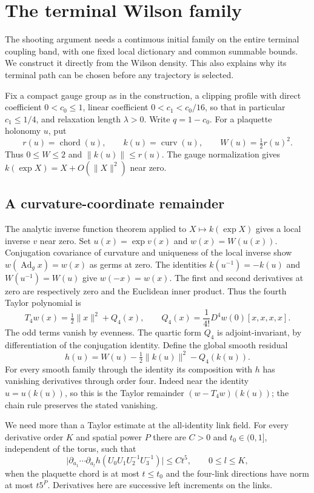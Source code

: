 \section{The terminal Wilson family}
\label{sec:wilson-startup-construction}
The shooting argument needs a continuous initial family on the entire
terminal coupling band, with one fixed local dictionary and common
summable bounds. We construct it directly from the Wilson density.
This also explains why its terminal path can be chosen before any
trajectory is selected.

Fix a compact gauge group as in the construction, a clipping profile
with direct coefficient $0<c_0\le1$, linear coefficient
$0<c_1<c_0/16$, so that in particular $c_1\le1/4$, and relaxation
length $\lambda>0$. Write $q=1-c_0$.
For a plaquette holonomy $u$, put
\[
 r(u)=\operatorname{chord}(u),\qquad
 k(u)=\operatorname{curv}(u),\qquad
 W(u)=\tfrac12r(u)^2.
\]
Thus $0\le W\le2$ and $\|k(u)\|\le r(u)$. The gauge normalization
gives $k(\exp X)=X+O(\|X\|^2)$ near zero.

\subsection{A curvature-coordinate remainder}
The analytic inverse function theorem applied to $X\mapsto k(\exp X)$
gives a local inverse $v$ near zero. Set $u(x)=\exp v(x)$ and
$w(x)=W(u(x))$. Conjugation covariance of curvature and uniqueness
of the local inverse show
$w(\operatorname{Ad}_g x)=w(x)$ as germs at zero. The identities
$k(u^{-1})=-k(u)$ and $W(u^{-1})=W(u)$ give $w(-x)=w(x)$.
The first and second derivatives at zero are respectively zero and
the Euclidean inner product. Thus the fourth Taylor polynomial is
\[
 T_4w(x)=\tfrac12\|x\|^2+Q_4(x),\qquad
 Q_4(x)=\frac1{4!}D^4w(0)[x,x,x,x].
\]
The odd terms vanish by evenness. The quartic form $Q_4$ is
adjoint-invariant, by differentiation of the conjugation identity.
Define the global smooth residual
\[
 h(u)=W(u)-\tfrac12\|k(u)\|^2-Q_4(k(u)).
\]
For every smooth family through the identity its composition with $h$
has vanishing derivatives through order four. Indeed near the
identity $u=u(k(u))$, so this is the Taylor remainder
$(w-T_4w)(k(u))$; the chain rule preserves the stated vanishing.

We need more than a Taylor estimate at the all-identity link field.
For every derivative order $K$ and spatial power $P$ there are
$C>0$ and $t_0\in(0,1]$, independent of the torus, such that
\begin{equation}\label{eq:startup-residual-price}
 \bigl|\partial_{a_1}\cdots\partial_{a_l}
              h(U_0U_1U_2^{-1}U_3^{-1})\bigr|
       \le Ct^5,\qquad 0\le l\le K,
\end{equation}
when the plaquette chord is at most $t\le t_0$ and the four-link
directions have norm at most $t5^P$. Derivatives here are successive
left increments on the links.


